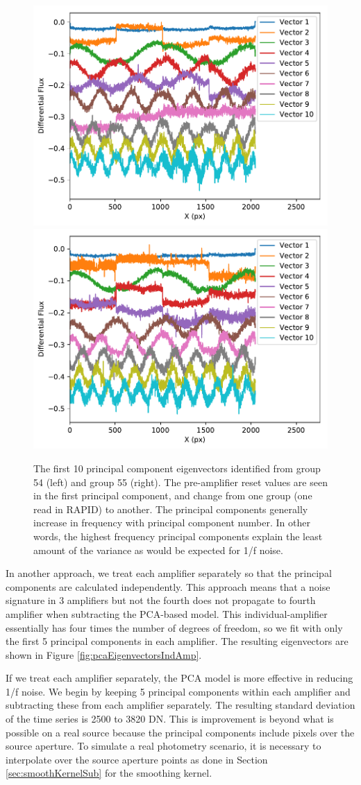 \documentclass{aastex62}
\begin{document}
\begin{figure}[!hbtp]
\centering
\includegraphics[width=.4\columnwidth]{pca_dark_amp_all_extra_bias_sub_grp_54.pdf}
\includegraphics[width=.4\columnwidth]{pca_dark_amp_all_extra_bias_sub_grp_55.pdf}
\caption{The first 10 principal component eigenvectors identified from group 54 (left) and group 55 (right).
The pre-amplifier reset values are seen in the first principal component, and change from one group (one read in RAPID) to another.
The principal components generally increase in frequency with principal component number.
In other words, the highest frequency principal components explain the least amount of the variance as would be expected for 1/f noise.
}\label{fig:pcaEigenvectors}
\end{figure}

In another approach, we treat each amplifier separately so that the principal components are calculated independently.
This approach means that a noise signature in 3 amplifiers but not the fourth does not propagate to fourth amplifier when subtracting the PCA-based model.
This individual-amplifier essentially has four times the number of degrees of freedom, so we fit with only the first 5 principal components in each amplifier.
The resulting eigenvectors are shown in Figure \ref{fig:pcaEigenvectorsIndAmp}.

If we treat each amplifier separately, the PCA model is more effective in reducing 1/f noise.
We begin by keeping 5 principal components within each amplifier and subtracting these from each amplifier separately.
The resulting standard deviation of the time series is 2500 to 3820 DN.
This is improvement is beyond what is possible on a real source because the principal components include pixels over the source aperture.
To simulate a real photometry scenario, it is necessary to interpolate over the source aperture points as done in Section \ref{sec:smoothKernelSub} for the smoothing kernel.
\end{document}
